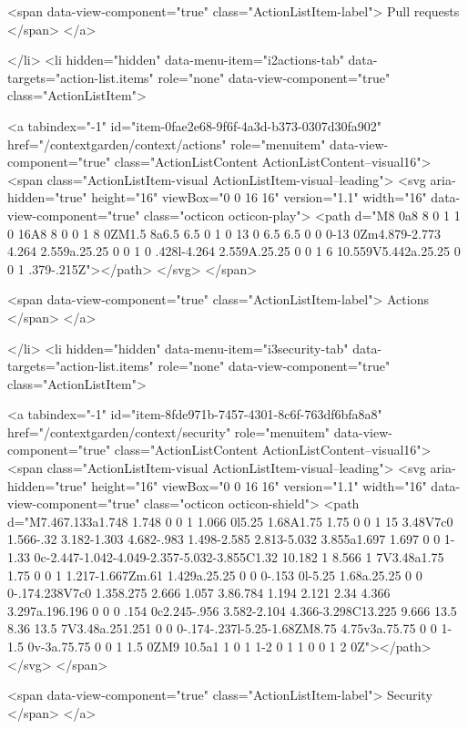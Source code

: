         <span data-view-component="true" class="ActionListItem-label">
          Pull requests
</span>      
</a>
  
</li>
        <li hidden="hidden" data-menu-item="i2actions-tab" data-targets="action-list.items" role="none" data-view-component="true" class="ActionListItem">
    
    
    <a tabindex="-1" id="item-0fae2e68-9f6f-4a3d-b373-0307d30fa902" href="/contextgarden/context/actions" role="menuitem" data-view-component="true" class="ActionListContent ActionListContent--visual16">
        <span class="ActionListItem-visual ActionListItem-visual--leading">
          <svg aria-hidden="true" height="16" viewBox="0 0 16 16" version="1.1" width="16" data-view-component="true" class="octicon octicon-play">
    <path d="M8 0a8 8 0 1 1 0 16A8 8 0 0 1 8 0ZM1.5 8a6.5 6.5 0 1 0 13 0 6.5 6.5 0 0 0-13 0Zm4.879-2.773 4.264 2.559a.25.25 0 0 1 0 .428l-4.264 2.559A.25.25 0 0 1 6 10.559V5.442a.25.25 0 0 1 .379-.215Z"></path>
</svg>
        </span>
      
        <span data-view-component="true" class="ActionListItem-label">
          Actions
</span>      
</a>
  
</li>
        <li hidden="hidden" data-menu-item="i3security-tab" data-targets="action-list.items" role="none" data-view-component="true" class="ActionListItem">
    
    
    <a tabindex="-1" id="item-8fde971b-7457-4301-8c6f-763df6bfa8a8" href="/contextgarden/context/security" role="menuitem" data-view-component="true" class="ActionListContent ActionListContent--visual16">
        <span class="ActionListItem-visual ActionListItem-visual--leading">
          <svg aria-hidden="true" height="16" viewBox="0 0 16 16" version="1.1" width="16" data-view-component="true" class="octicon octicon-shield">
    <path d="M7.467.133a1.748 1.748 0 0 1 1.066 0l5.25 1.68A1.75 1.75 0 0 1 15 3.48V7c0 1.566-.32 3.182-1.303 4.682-.983 1.498-2.585 2.813-5.032 3.855a1.697 1.697 0 0 1-1.33 0c-2.447-1.042-4.049-2.357-5.032-3.855C1.32 10.182 1 8.566 1 7V3.48a1.75 1.75 0 0 1 1.217-1.667Zm.61 1.429a.25.25 0 0 0-.153 0l-5.25 1.68a.25.25 0 0 0-.174.238V7c0 1.358.275 2.666 1.057 3.86.784 1.194 2.121 2.34 4.366 3.297a.196.196 0 0 0 .154 0c2.245-.956 3.582-2.104 4.366-3.298C13.225 9.666 13.5 8.36 13.5 7V3.48a.251.251 0 0 0-.174-.237l-5.25-1.68ZM8.75 4.75v3a.75.75 0 0 1-1.5 0v-3a.75.75 0 0 1 1.5 0ZM9 10.5a1 1 0 1 1-2 0 1 1 0 0 1 2 0Z"></path>
</svg>
        </span>
      
        <span data-view-component="true" class="ActionListItem-label">
          Security
</span>      
</a>
  
